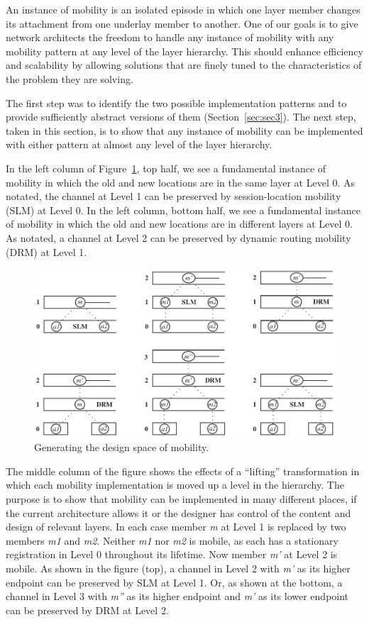 An instance of mobility is an isolated
episode in which one layer member changes
its attachment from one underlay member to another.
One of our goals is to give network architects the freedom to handle
any instance of mobility with any mobility pattern at any level of
the layer hierarchy.
This should enhance efficiency and scalability by
allowing solutions that are finely tuned to the characteristics of
the problem they are solving.

The first step was to identify the two possible implementation patterns
and to provide sufficiently abstract versions of them
(Section~\ref{sec:sec3}).
The next step, taken in this section, is to show that any instance of
mobility can be implemented with either pattern at almost any level of
the layer hierarchy.

In the left column of Figure~\ref{fig:lift}, top half, we see a
fundamental instance of mobility in which the old and new locations
are in the same layer at Level 0.
As notated, the channel at Level 1 can be preserved by session-location
mobility (SLM) at Level 0.
In the left column, bottom half, we see a
fundamental instance of mobility in which the old and new locations
are in different layers at Level 0.
As notated, a channel at Level 2 can be preserved by dynamic routing
mobility (DRM) at Level 1.

\begin{figure}
\label{sec:fig:lift}
\centering
\includegraphics[scale=0.75]{figures/lift.pdf}
\caption{Generating the design space of mobility.}
\label{fig:lift}
\end{figure}

The middle column of the figure shows the effects of a ``lifting''
transformation in which each mobility implementation is moved up a level
in the hierarchy.
The purpose is to show that mobility can be implemented in many different
places, if the current architecture allows it or the designer has
control of the content and design of relevant layers.
In each case member {\it m} at Level 1 is replaced by two members
{\it m1} and {\it m2}.
Neither {\it m1} nor {\it m2} is mobile, as each has a stationary
registration in Level 0 throughout its lifetime.
Now member {\it m'} at Level 2 is mobile.
As shown in the figure (top), a channel in Level 2
with {\it m'} as its higher endpoint
can be preserved by SLM at Level 1. 
Or, as shown at the bottom, a channel in Level 3 with {\it m''} as
its higher endpoint and {\it m'} as its lower endpoint can be preserved
by DRM at Level 2.

